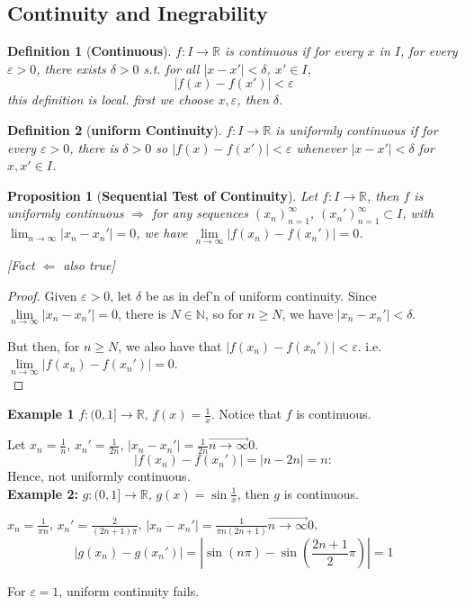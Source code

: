 \documentclass[12pt]{article}
\theoremstyle{plain}
\newtheorem{definition}{Definition}[subsection]
\newtheorem{proposition}{Proposition}[subsection]
\newcommand{\abs}[1]{\left| #1 \right|}
\newcommand{\ep}{\varepsilon}
\newcommand{\dlim}{\displaystyle\lim\limits}
\begin{document}
	
	
	\subsection{Continuity and Inegrability}
	\begin{definition}[\textbf{Continuous}]
		$f: I \to \mathbb{R}$ is continuous if for every $x$ in $I$, for every
		$\ep>0$, there exists $\delta >0$ s.t. for all $\abs{x-x'}<\delta$, 
		$x'\in I$, 
		\[ 
			\abs{f(x) -f(x')} < \ep 
		\]
		this definition is local. first we choose $x, \ep$, then $\delta$.\\
	\end{definition}

	\begin{definition}[\textbf{uniform Continuity}]
		$f: I \to \mathbb{R}$ is uniformly continuous if for every $\ep > 0$,
		there is $\delta > 0$ so $\abs{f(x)-f(x')}<\ep$ whenever 
		$\abs{x-x'}<\delta$ for $x, x' \in I$. \\
	\end{definition}

	\begin{proposition}[\textbf{Sequential Test of Continuity}]
		Let $f:I\to \mathbb{R}$, then $f$ is uniformly continuous $\Rightarrow$
		for any sequences $(x_n)_{n=1}^{\infty}$, $(x_n')_{n=1}^{\infty} 
		\subset I$, with $\lim_{n\to \infty} \abs{x_n-x_n'} = 0$, 
		we have $\dlim_{n\to\infty} \abs{f(x_n)-f(x_n')} = 0$. 

		[Fact $\Leftarrow$ also true]
	\end{proposition}
	\begin{proof}
		Given $\ep > 0$, let $\delta$ be as in def'n of uniform continuity.
		Since $\dlim_{n\to\infty} \abs{x_n-x_n'} =0$, there is $N\in\mathbb{N}$,
		so for $n\geq N$, we have $\abs{x_n-x_n'}<\delta$. 

		But then, for $n\geq N$, we also have that $\abs{f(x_n)-f(x_n')}<\ep$.
		i.e. $\dlim_{n\to\infty} \abs{f(x_n)-f(x_n')} = 0$.\\
	\end{proof}

	{\color{Brown}
	\textbf{Example 1}
	$f: (0,1] \to \mathbb{R}$, $f(x) = \frac 1x$. Notice that $f$ is continuous.
	
	Let $x_n=\frac 1n$, $x_n'=\frac1{2n}$, 
	$\abs{x_n-x_n'}=\frac1{2n} \overset{\to}{n\to\infty} 0$.
	\[
		\abs{f(x_n)-f(x_n')} = \abs{n-2n} = n
	:\]
	Hence, not uniformly continuous. \\

	\textbf{Example 2:} $g:(0,1]\to\mathbb{R}$, $g(x) = \sin \frac 1x$, then
	$g$ is continuous. 

	$x_n = \frac 1{\pi n}$, $x_n'=\frac 2{(2n+1)\pi}$, 
	$\abs{x_n-x_n'}=\frac1{\pi n (2n+1)} \overset{\to}{n\to\infty} 0$, 
	\[
		\abs{g(x_n)-g(x_n')} = \abs{\sin(n\pi)-\sin(\frac{2n+1}2\pi)} = 1
	\]

	For $\ep = 1$, uniform continuity fails. \\
	}
\end{document}
